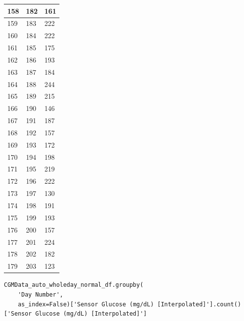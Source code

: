 \begin{tabular}{p{}p{}p{}}
\hline
158 & 182 & 161 \\
\hline
159 & 183 & 222 \\
\hline
160 & 184 & 222 \\
\hline
161 & 185 & 175 \\
\hline
162 & 186 & 193 \\
\hline
163 & 187 & 184 \\
\hline
164 & 188 & 244 \\
\hline
165 & 189 & 215 \\
\hline
166 & 190 & 146 \\
\hline
167 & 191 & 187 \\
\hline
168 & 192 & 157 \\
\hline
169 & 193 & 172 \\
\hline
170 & 194 & 198 \\
\hline
171 & 195 & 219 \\
\hline
172 & 196 & 222 \\
\hline
173 & 197 & 130 \\
\hline
174 & 198 & 191 \\
\hline
175 & 199 & 193 \\
\hline
176 & 200 & 157 \\
\hline
177 & 201 & 224 \\
\hline
178 & 202 & 182 \\
\hline
179 & 203 & 123 \\
\hline
\bottomrule
\end{tabular}

\bigskip

\begin{verbatim}
CGMData_auto_wholeday_normal_df.groupby(
    'Day Number',
    as_index=False)['Sensor Glucose (mg/dL) [Interpolated]'].count()['Sensor Glucose (mg/dL) [Interpolated]']
\end{verbatim}

